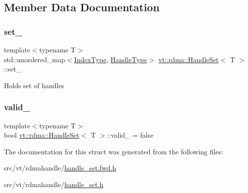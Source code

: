 \subsection{Member Data Documentation}
\mbox{\label{structvt_1_1rdma_1_1_handle_set_a1864dc0d064a06915f3ceb2e6e13f875}} 
\subsubsection{\texorpdfstring{set\+\_\+}{set\_}}
{\footnotesize\ttfamily template$<$typename T$>$ \\
std\+::unordered\+\_\+map$<$\hyperlink{structvt_1_1rdma_1_1_handle_set_aa0dbb6a47c459fb4290f0ca96e573097}{Index\+Type}, \hyperlink{structvt_1_1rdma_1_1_handle_set_ab3a698ee86bae503dfa84617205b2dd9}{Handle\+Type}$>$ \hyperlink{structvt_1_1rdma_1_1_handle_set}{vt\+::rdma\+::\+Handle\+Set}$<$ T $>$\+::set\+\_\+\hspace{0.3cm}{\ttfamily [private]}}

Holds set of handles \mbox{\label{structvt_1_1rdma_1_1_handle_set_a60d4c2fb59c226743eb8d9cb79d00e7a}} 
\subsubsection{\texorpdfstring{valid\+\_\+}{valid\_}}
{\footnotesize\ttfamily template$<$typename T$>$ \\
bool \hyperlink{structvt_1_1rdma_1_1_handle_set}{vt\+::rdma\+::\+Handle\+Set}$<$ T $>$\+::valid\+\_\+ = false\hspace{0.3cm}{\ttfamily [private]}}



The documentation for this struct was generated from the following files\+:\begin{DoxyCompactItemize}
\item 
src/vt/rdmahandle/\hyperlink{handle__set_8fwd_8h}{handle\+\_\+set.\+fwd.\+h}\item 
src/vt/rdmahandle/\hyperlink{handle__set_8h}{handle\+\_\+set.\+h}\end{DoxyCompactItemize}

